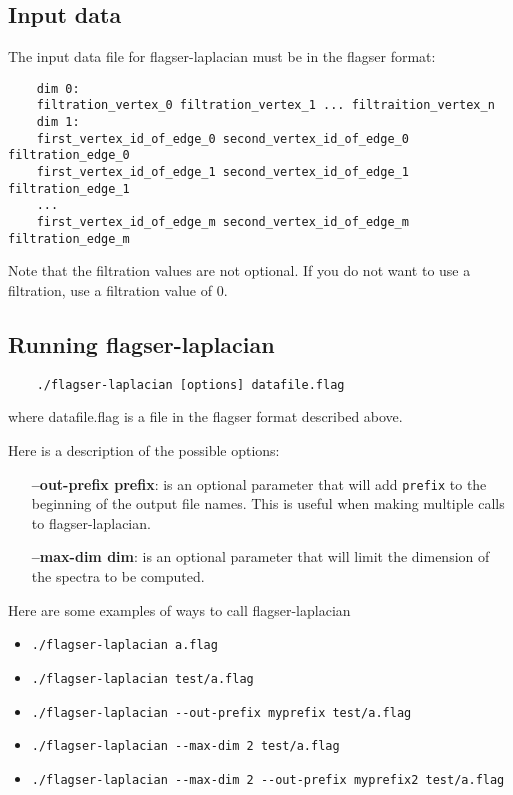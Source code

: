 \documentclass{article}
\begin{document}
\subsection{Input data}
The input data file for flagser-laplacian must be in the flagser format:

\begin{verbatim}
    dim 0:
    filtration_vertex_0 filtration_vertex_1 ... filtraition_vertex_n
    dim 1:
    first_vertex_id_of_edge_0 second_vertex_id_of_edge_0 filtration_edge_0
    first_vertex_id_of_edge_1 second_vertex_id_of_edge_1 filtration_edge_1
    ...
    first_vertex_id_of_edge_m second_vertex_id_of_edge_m filtration_edge_m
\end{verbatim}

Note that the filtration values are not optional. If you do not want to use a filtration, use a filtration value of $0$.

\subsection{Running flagser-laplacian}
\begin{verbatim}
    ./flagser-laplacian [options] datafile.flag
\end{verbatim}

where datafile.flag is a file in the flagser format described above.

Here is a description of the possible options:

\begin{itemize}
    \item[\textbf{--out-prefix prefix}:] is an optional parameter that will add \verb|prefix| to the beginning of the output file names. This is useful when making multiple calls to flagser-laplacian.
    \item[\textbf{--max-dim dim}:] is an optional parameter that will limit the dimension of the spectra to be computed.
\end{itemize}

Here are some examples of ways to call flagser-laplacian

\begin{itemize}
    \item \verb|./flagser-laplacian a.flag|
    \item \verb|./flagser-laplacian test/a.flag|
    \item \verb|./flagser-laplacian --out-prefix myprefix test/a.flag|
    \item \verb|./flagser-laplacian --max-dim 2 test/a.flag|
    \item \verb|./flagser-laplacian --max-dim 2 --out-prefix myprefix2 test/a.flag|
\end{itemize}
\end{document}
